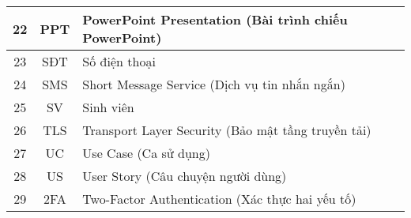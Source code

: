 \begin{table}[h!]
\begin{tabular}{|c|c|l|}
\hline
22 & PPT & PowerPoint Presentation (Bài trình chiếu PowerPoint) \\ 
\hline
23 & SĐT & Số điện thoại \\ 
\hline
24 & SMS & Short Message Service (Dịch vụ tin nhắn ngắn) \\ 
\hline
25 & SV & Sinh viên \\ 
\hline
26 & TLS & Transport Layer Security (Bảo mật tầng truyền tải) \\ 
\hline
27 & UC & Use Case (Ca sử dụng) \\ 
\hline
28 & US & User Story (Câu chuyện người dùng) \\
\hline
29 & 2FA & Two-Factor Authentication (Xác thực hai yếu tố) \\ 
\hline
\end{tabular}
\end{table}

\pagebreak

\listoffigures
\listoftables
\pagebreak
{}
